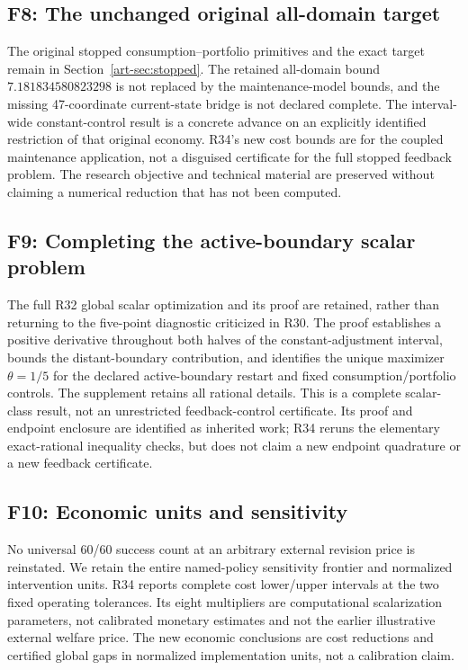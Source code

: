 \subsection{F8: The unchanged original all-domain target}
The original stopped consumption--portfolio primitives and the exact target remain in Section~\ref{art-sec:stopped}. The retained all-domain bound $7.181834580823298$ is not replaced by the maintenance-model bounds, and the missing 47-coordinate current-state bridge is not declared complete. The interval-wide constant-control result is a concrete advance on an explicitly identified restriction of that original economy. R34's new cost bounds are for the coupled maintenance application, not a disguised certificate for the full stopped feedback problem. The research objective and technical material are preserved without claiming a numerical reduction that has not been computed.

\subsection{F9: Completing the active-boundary scalar problem}
The full R32 global scalar optimization and its proof are retained, rather than returning to the five-point diagnostic criticized in R30. The proof establishes a positive derivative throughout both halves of the constant-adjustment interval, bounds the distant-boundary contribution, and identifies the unique maximizer $\theta=1/5$ for the declared active-boundary restart and fixed consumption/portfolio controls. The supplement retains all rational details. This is a complete scalar-class result, not an unrestricted feedback-control certificate. Its proof and endpoint enclosure are identified as inherited work; R34 reruns the elementary exact-rational inequality checks, but does not claim a new endpoint quadrature or a new feedback certificate.

\subsection{F10: Economic units and sensitivity}
No universal 60/60 success count at an arbitrary external revision price is reinstated. We retain the entire named-policy sensitivity frontier and normalized intervention units. R34 reports complete cost lower/upper intervals at the two fixed operating tolerances. Its eight multipliers are computational scalarization parameters, not calibrated monetary estimates and not the earlier illustrative external welfare price. The new economic conclusions are cost reductions and certified global gaps in normalized implementation units, not a calibration claim.

